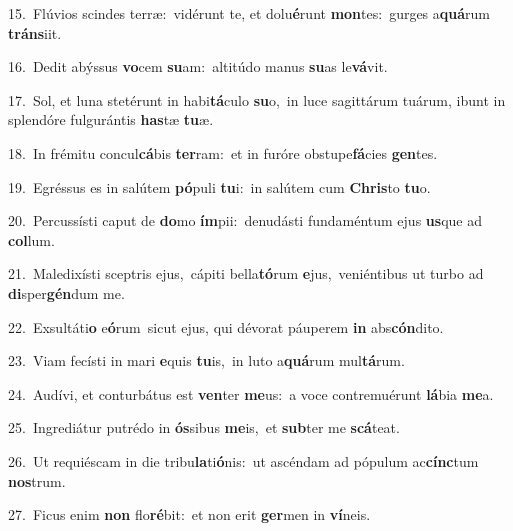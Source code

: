 {\numbfont\textcolor{\numbcolor}{15.}}~Flúvios scindes terræ:~\dagger vidérunt te, et dolu\-\textbf{é}\-runt \textbf{mon}\-tes:~\star gurges a\-\textbf{quá}\-rum \textbf{tráns}\-iit.\par
{\numbfont\textcolor{\numbcolor}{16.}}~Dedit abýssus \textbf{vo}\-cem \textbf{su}\-am:~\star altitúdo manus \textbf{su}\-as le\-\textbf{vá}\-vit.\par
{\numbfont\textcolor{\numbcolor}{17.}}~Sol, et luna stetérunt in habi\-\textbf{tá}\-culo \textbf{su}\-o,~\star in luce sagittárum tuárum, ibunt in splendóre fulgurántis \textbf{has}\-tæ \textbf{tu}\-æ.\par
{\numbfont\textcolor{\numbcolor}{18.}}~In frémitu concul\-\textbf{cá}\-bis \textbf{ter}\-ram:~\star et in furóre obstupe\-\textbf{fá}\-cies \textbf{gen}\-tes.\par
{\numbfont\textcolor{\numbcolor}{19.}}~Egréssus es in salútem \textbf{pó}\-puli \textbf{tu}\-i:~\star in salútem cum \textbf{Chris}\-to \textbf{tu}\-o.\par
{\numbfont\textcolor{\numbcolor}{20.}}~Percussísti caput de \textbf{do}\-mo \textbf{ím}\-pii:~\star denudásti fundaméntum ejus \textbf{us}\-que ad \textbf{col}\-lum.\par
{\numbfont\textcolor{\numbcolor}{21.}}~Maledixísti sceptris ejus,~\dagger cápiti bella\-\textbf{tó}\-rum \textbf{e}\-jus,~\star veniéntibus ut turbo ad \textbf{di}\-sper\-\textbf{gén}\-dum me.\par
{\numbfont\textcolor{\numbcolor}{22.}}~Exsultáti\textbf{o} e\-\textbf{ó}\-rum~\star sicut ejus, qui dévorat páuperem \textbf{in} abs\-\textbf{cón}\-dito.\par
{\numbfont\textcolor{\numbcolor}{23.}}~Viam fecísti in mari \textbf{e}\-quis \textbf{tu}\-is,~\star in luto a\-\textbf{quá}\-rum mul\-\textbf{tá}\-rum.\par
{\numbfont\textcolor{\numbcolor}{24.}}~Audívi, et conturbátus est \textbf{ven}\-ter \textbf{me}\-us:~\star a voce contremuérunt \textbf{lá}\-bia \textbf{me}\-a.\par
{\numbfont\textcolor{\numbcolor}{25.}}~Ingrediátur putrédo in \textbf{ós}\-sibus \textbf{me}\-is,~\star et \textbf{sub}\-ter me \textbf{scá}\-teat.\par
{\numbfont\textcolor{\numbcolor}{26.}}~Ut requiéscam in die tribu\-\textbf{la}\-ti\-\textbf{ó}\-nis:~\star ut ascéndam ad pópulum ac\-\textbf{cínc}\-tum \textbf{nos}\-trum.\par
{\numbfont\textcolor{\numbcolor}{27.}}~Ficus enim \textbf{non} flo\-\textbf{ré}\-bit:~\star et non erit \textbf{ger}\-men in \textbf{ví}\-neis.\par
